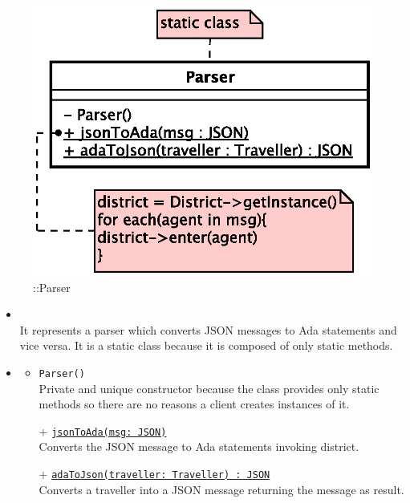 \begin{figure}[h]
\centering
\includegraphics[scale=0.6,keepaspectratio]{images/solution/app/backend/parser.eps}
\caption{\pInterface::Parser}
\label{fig:sd-app-parser}
\end{figure}
\FloatBarrier
\begin{itemize}
  \item \textbf{\descr} \\
    It represents a parser which converts JSON messages to Ada statements and vice versa.
    It is a static class because it is composed of only static methods.
  \item \textbf{\ops}
  \begin{itemize}
   \item \texttt{Parser()} \\
   Private and unique constructor because the class provides only static methods 
    so there are no reasons a client creates instances of it.
    \item[+] \texttt{\underline{jsonToAda(msg: JSON)}} \\
    Converts the JSON message to Ada statements invoking district.
    \item[+] \texttt{\underline{adaToJson(traveller: Traveller) : JSON}} \\
    Converts a traveller into a JSON message returning the message as result.
  \end{itemize}
\end{itemize}
